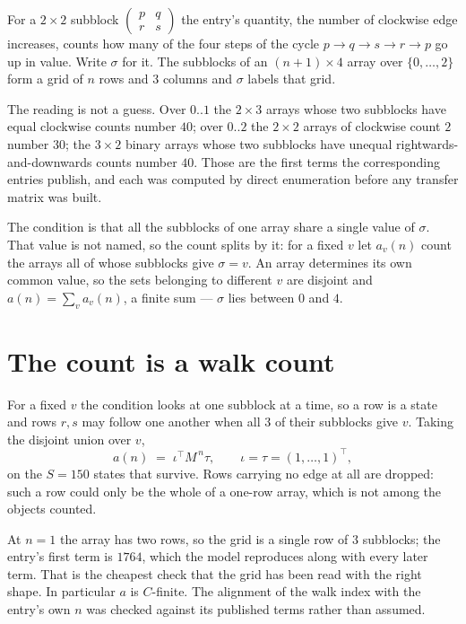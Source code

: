 \documentclass[11pt,a4paper]{article}
\theoremstyle{plain}
\theoremstyle{definition}
\begin{document}
For a $2\times2$ subblock $\begin{pmatrix}p&q\\r&s\end{pmatrix}$ the
entry's quantity, the number of clockwise edge increases, counts how many of the four steps of the cycle $p\to q\to s\to r\to p$ go up in value. Write $\sigma$ for it. The subblocks of an
$(n+1)\times4$ array over $\{0,\dots,2\}$ form a grid of $n$ rows and $3$
columns and $\sigma$ labels that grid.

The reading is not a guess. Over $0..1$ the $2\times3$ arrays whose two subblocks have equal
clockwise counts number $40$; over $0..2$ the $2\times2$ arrays of clockwise count $2$ number
$30$; the $3\times2$ binary arrays whose two subblocks have unequal rightwards-and-downwards
counts number $40$. Those are the first terms the corresponding entries publish, and each was
computed by direct enumeration before any transfer matrix was built.

The condition is that all the subblocks of one array share a single value of $\sigma$. That
value is not named, so the count splits by it: for a fixed $v$ let $a_v(n)$ count the arrays all
of whose subblocks give $\sigma=v$. An array determines its own common value, so the sets
belonging to different $v$ are disjoint and $a(n)=\sum_v a_v(n)$, a finite sum --- $\sigma$
lies between $0$ and $4$.

\section{The count is a walk count}

For a fixed $v$ the condition looks at one subblock at a time, so a row is
a state and rows $r,s$ may follow one another when all $3$ of their subblocks give $v$.
Taking the disjoint union over $v$,
\[
a(n)\;=\;\iota^{\!\top}M^{\,n}\tau,\qquad\iota=\tau=(1,\dots,1)^{\!\top},
\]
on the $S=150$ states that survive. Rows carrying no edge at all are dropped: such a row could
only be the whole of a one-row array, which is not among the objects counted.

At $n=1$ the array has two rows, so the grid is a single row of $3$
subblocks; the entry's first term is $1764$, which the model
reproduces along with every later term. That is the cheapest check that the grid has been read
with the right shape.
In particular $a$ is $C$-finite. The alignment of the walk index with the entry's own $n$ was
checked against its published terms rather than assumed.
\end{document}
